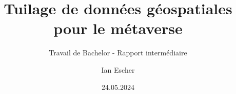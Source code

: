 \author{Ian Escher}


\title{Tuilage de données géospatiales pour le métaverse}

\subtitle{Travail de Bachelor - Rapport intermédiaire}


\date{24.05.2024}

\thesis{-}


